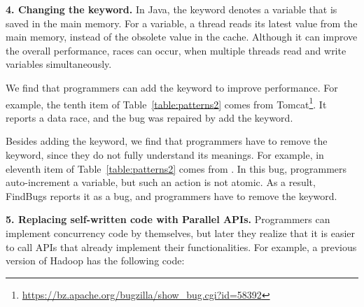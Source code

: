 


\noindent
\textbf{4. Changing the  keyword.} In Java, the  keyword denotes a variable that is saved in the main memory. For a  variable, a thread reads its latest value from the main memory, instead of the obsolete  value in the cache. Although it can improve the overall performance, races can occur, when multiple threads read and write  variables simultaneously.

We find that programmers can add the  keyword to improve performance. For example, the tenth item of Table~\ref{table:patterns2} comes from Tomcat\footnote{\url{https://bz.apache.org/bugzilla/show_bug.cgi?id=58392}}. It reports a data race, and the bug was repaired by add the  keyword.


Besides adding the keyword, we find that programmers have to remove the  keyword, since they do not fully understand its meanings. For example, in eleventh item of Table~\ref{table:patterns2} comes from . In this bug, programmers auto-increment a  variable, but such an action is not atomic. As a result, FindBugs reports it as a bug, and programmers have to remove the keyword.

\noindent
\textbf{5. Replacing self-written code with Parallel APIs.} Programmers can implement concurrency code by themselves, but later they realize that it is easier to call APIs that already implement their functionalities. For example, a previous version of Hadoop has the following code:%

%

